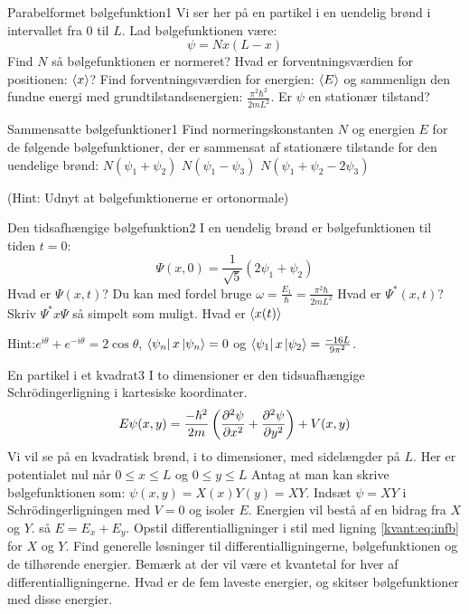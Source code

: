 \begin{opgave}{Parabelformet bølgefunktion}{1}\label{kvant:opg:parabel}
Vi ser her på en partikel i en uendelig brønd i intervallet fra $0$ til $L$. Lad bølgefunktionen være:
$$
\psi = Nx(L-x)
$$
\opg Find $N$ så bølgefunktionen er normeret?
\opg Hvad er forventningsværdien for positionen: $\expect x$?
\opg Find forventningsværdien for energien: $\expect E$ og sammenlign den fundne energi med grundtilstandsenergien: $\frac{\pi^2\hbar^2}{2mL^2}$.
\opg Er $\psi$ en stationær tilstand?
\end{opgave}

\begin{opgave}{Sammensatte bølgefunktioner}{1}
Find normeringskonstanten $N$ og energien $E$ for de følgende bølgefunktioner, der er sammensat af stationære tilstande for den uendelige brønd:
\opg $N(\psi_1+\psi_2)$
\opg $N(\psi_1-\psi_3)$
\opg $N(\psi_1+\psi_2-2\psi_3)$

(Hint: Udnyt at bølgefunktionerne er ortonormale)
\end{opgave}

\begin{opgave}{Den tidsafhængige bølgefunktion}{2}
I en uendelig brønd er bølgefunktionen til tiden $t=0$:
$$
\Psi(x,0) = \frac{1}{\sqrt{5}}(2\psi_1+\psi_2)
$$
\opg Hvad er $\Psi(x,t)$? Du kan med fordel bruge $\omega = \frac{E_1}{\hbar} = \frac{\pi^2\hbar}{2mL^2}$
\opg Hvad er $\Psi^*(x,t)$?
\opg Skriv $\Psi^*x\Psi$ så simpelt som muligt.
\opg Hvad er $\expect{x(t)}$

Hint:$e^{i\theta}+e^{-i\theta} = 2\cos \theta$, $\matrixel{\psi_n}{x}{\psi_n} = 0$ og $\matrixel{\psi_1}{x}{\psi_2}=\frac{-16L}{9\pi^2}$.
\end{opgave}

\begin{opgave}{En partikel i et kvadrat}{3}
I to dimensioner er den tidsuafhængige Schrödingerligning i kartesiske koordinater.
$$
E\psi(x,y) = \frac{-\hbar^2}{2m}\left(\pdif[2]{x}\psi +\pdif[2]{y}\psi\right) + V(x,y)
$$
Vi vil se på en kvadratisk brønd, i to dimensioner, med sidelængder på $L$. Her er potentialet nul når $0\leq x\leq L$ og $0\leq y\leq L$
Antag at man kan skrive bølgefunktionen som: $\psi(x,y) = X(x)Y(y) = XY$.
\opg Indsæt $\psi = XY$ i Schrödingerligningen med $V=0$ og isoler $E$.
\opg Energien vil bestå af en bidrag fra $X$ og $Y$. så $E=E_x+E_y$. Opstil differentialligninger i stil med ligning \eqref{kvant:eq:infb} for $X$ og $Y$.
\opg Find generelle løsninger til differentialligningerne, bølgefunktionen og de tilhørende energier. Bemærk at der vil være et kvantetal for hver af differentialligningerne. 
\opg Hvad er de fem laveste energier, og skitser bølgefunktioner med disse energier.
\end{opgave}


